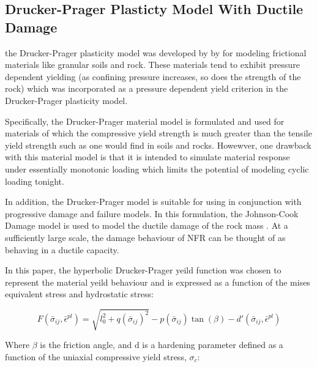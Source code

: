 \subsection{Drucker-Prager Plasticty Model With Ductile Damage}

the Drucker-Prager plasticity model was developed by by \citet{drucker_implications_1950} for modeling frictional materials like granular soils and rock. These materials tend  to exhibit pressure dependent yielding (as confining
pressure increases, so does the strength of the rock) which was incorporated as a pressure dependent yield criterion in the Drucker-Prager plasticity model. 

Specifically, the Drucker-Prager material model is formulated and used for materials of which the compressive yield strength is much greater than the tensile yield strength such as one would find in soils and rocks. Howewver, one drawback with this material model is that it is intended to simulate material response under essentially monotonic loading which limits the potential of modeling cyclic loading tonight.

In addition, the Drucker-Prager model is suitable for using in conjunction with progressive damage and failure models. In this formulation, the Johnson-Cook Damage model is used to model the ductile damage of the rock mass \cite{johnson_fracture_1985}. At a sufficiently large scale, the damage behaviour of NFR can be thought of as behaving in a ductile capacity. 




In this paper, the hyperbolic Drucker-Prager yeild function was chosen to represent the material yeild behaviour and is expressed as a function of the mises equivalent stress and hydrostatic stress:

\begin{equation}
F\left(\bar{\sigma}_{ij}, \bar{\epsilon}^{pl}\right)=\sqrt{l_{0}^{2}+q\left(\bar{\sigma}_{ij}\right)^{2}}-p\left(\bar{\sigma}_{ij}\right)\tan\left(\beta\right)-d'\left(\bar{\sigma}_{ij}, \bar{\epsilon}^{pl}\right)\label{eqn:druc2}
\end{equation}

Where $\beta$ is the friction angle, and d is a hardening parameter defined as a function of the uniaxial compressive yield stress, $\sigma_c$:


